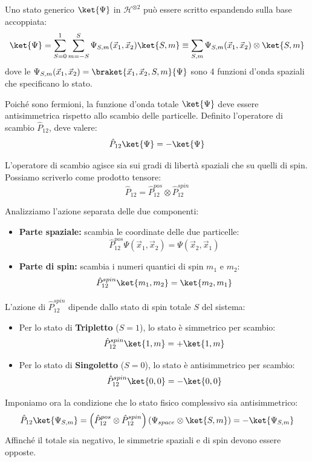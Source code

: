 Uno stato generico \(\ket{\Psi}\) in \(\mathcal{H}^{\otimes 2}\) può essere scritto espandendo sulla base accoppiata:
\begin{equation}
    \ket{\Psi} = \sum_{S=0}^{1} \sum_{m=-S}^{S} \Psi_{S,m}(\vec{x}_1, \vec{x}_2) \ket{S, m}
        \equiv \sum_{S,m} \Psi_{S,m}(\vec{x}_1, \vec{x}_2) \otimes \ket{S, m}
\end{equation}
dove le \(\Psi_{S,m}(\vec{x}_1, \vec{x}_2) = \braket{\vec{x}_1, \vec{x}_2, S, m}{\Psi}\) sono 4 funzioni d'onda spaziali che specificano lo stato.

Poiché sono fermioni, la funzione d'onda totale $\ket{\Psi}$ deve essere antisimmetrica rispetto allo scambio delle particelle. Definito l'operatore di scambio $\hat{P}_{12}$, deve valere:
\[
    \hat{P}_{12} \ket{\Psi} = - \ket{\Psi}
\]

L'operatore di scambio agisce sia sui gradi di libertà spaziali che su quelli di spin. Possiamo scriverlo come prodotto tensore:
\[
    \hat{P}_{12} = \hat{P}_{12}^{pos} \otimes \hat{P}_{12}^{spin}
\]

Analizziamo l'azione separata delle due componenti:
\begin{itemize}
    \item \textbf{Parte spaziale:} scambia le coordinate delle due particelle:
    \[
    \hat{P}_{12}^{pos} \Psi(\vec{x}_1, \vec{x}_2) = \Psi(\vec{x}_2, \vec{x}_1)
    \]
    \item \textbf{Parte di spin:} scambia i numeri quantici di spin $m_1$ e $m_2$:
    \[
    \hat{P}_{12}^{spin} \ket{m_1, m_2} = \ket{m_2, m_1}
    \]
\end{itemize}


L'azione di $\hat{P}_{12}^{spin}$ dipende dallo stato di spin totale $S$ del sistema:
\begin{itemize}
    \item Per lo stato di \textbf{Tripletto} ($S=1$), lo stato è simmetrico per scambio:
    \[
    \hat{P}_{12}^{spin} \ket{1, m} = + \ket{1, m}
    \]
    \item Per lo stato di \textbf{Singoletto} ($S=0$), lo stato è antisimmetrico per scambio:
    \[
    \hat{P}_{12}^{spin} \ket{0, 0} = - \ket{0, 0}
    \]
\end{itemize}

Imponiamo ora la condizione che lo stato fisico complessivo sia antisimmetrico:
\[
    \hat{P}_{12} \ket{\Psi_{S,m}} = \left( \hat{P}_{12}^{pos} \otimes \hat{P}_{12}^{spin} \right) \left( \Psi_{space} \otimes \ket{S,m} \right) = - \ket{\Psi_{S,m}}
\]
Affinché il totale sia negativo, le simmetrie spaziali e di spin devono essere opposte.


